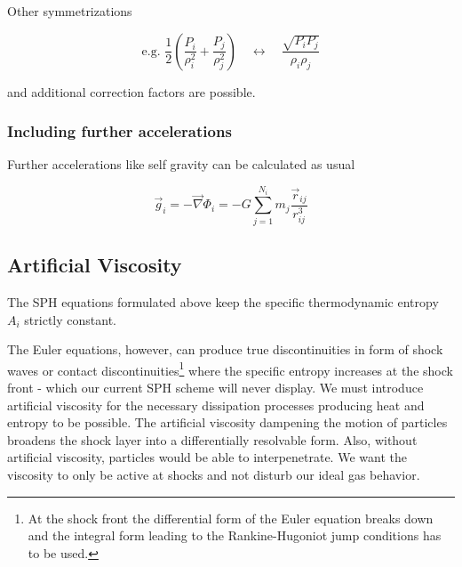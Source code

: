 


Other symmetrizations

\begin{equation}
    \text{e.g. } \frac{1}{2} \left( \frac{P_i}{\rho_i^2} + \frac{P_j}{\rho_j^2} \right) \quad \leftrightarrow \quad \frac{\sqrt{P_i P_j}}{\rho_i \rho_j} 
\end{equation}

and additional correction factors are possible.

\subsubsection{Including further accelerations}
Further accelerations like self gravity can be calculated as usual

\begin{equation}
    \vec{g}_i = -\vec{\nabla} \Phi_i = - G \sum_{j=1}^{N_i} m_j \frac{\vec{r}_{i j}}{r_{i j}^3}
\end{equation}

\subsection{Artificial Viscosity}
The SPH equations formulated above keep the specific thermodynamic entropy $A_i$ strictly constant.
 
The Euler equations, however, can produce true discontinuities in form of shock waves or contact discontinuities\footnote{At the shock front the differential form of the Euler equation breaks down and the integral form leading to the Rankine-Hugoniot jump conditions has to be used.} where the specific entropy increases at the shock front - which our current SPH scheme will never display.
We must introduce artificial viscosity for the necessary dissipation processes producing heat and entropy to be possible. The artificial viscosity dampening the motion of particles broadens the shock layer into a differentially resolvable form.
Also, without artificial viscosity, particles would be able to interpenetrate.
We want the viscosity to only be active at shocks and not disturb our ideal gas behavior.

